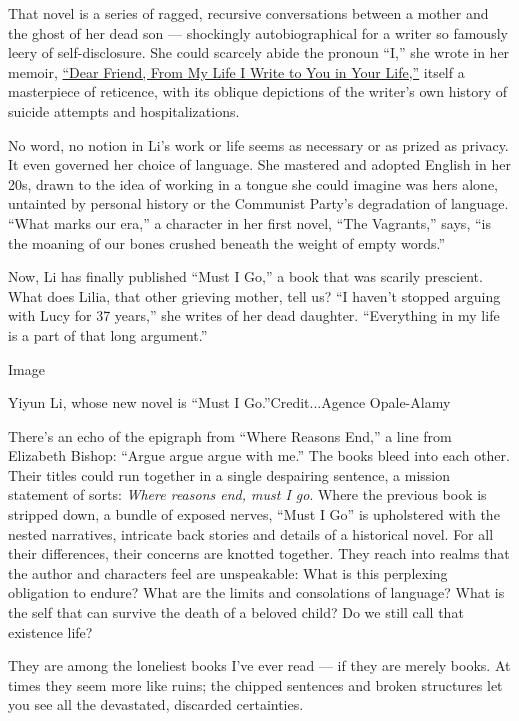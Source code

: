 That novel is a series of ragged, recursive conversations between a
mother and the ghost of her dead son --- shockingly autobiographical for
a writer so famously leery of self-disclosure. She could scarcely abide
the pronoun ``I,'' she wrote in her memoir,
\href{https://www.nytimes3xbfgragh.onion/2017/02/15/books/review/dear-friend-from-my-life-i-write-to-you-in-your-life-yiyun-li.html}{``Dear
Friend, From My Life I Write to You in Your Life,''} itself a
masterpiece of reticence, with its oblique depictions of the writer's
own history of suicide attempts and hospitalizations.

No word, no notion in Li's work or life seems as necessary or as prized
as privacy. It even governed her choice of language. She mastered and
adopted English in her 20s, drawn to the idea of working in a tongue she
could imagine was hers alone, untainted by personal history or the
Communist Party's degradation of language. ``What marks our era,'' a
character in her first novel, ``The Vagrants,'' says, ``is the moaning
of our bones crushed beneath the weight of empty words.''

Now, Li has finally published ``Must I Go,'' a book that was scarily
prescient. What does Lilia, that other grieving mother, tell us? ``I
haven't stopped arguing with Lucy for 37 years,'' she writes of her dead
daughter. ``Everything in my life is a part of that long argument.''

Image

Yiyun Li, whose new novel is ``Must I Go.''Credit...Agence Opale-Alamy

There's an echo of the epigraph from ``Where Reasons End,'' a line from
Elizabeth Bishop: ``Argue argue argue with me.'' The books bleed into
each other. Their titles could run together in a single despairing
sentence, a mission statement of sorts: \emph{Where reasons end, must I
go}. Where the previous book is stripped down, a bundle of exposed
nerves, ``Must I Go'' is upholstered with the nested narratives,
intricate back stories and details of a historical novel. For all their
differences, their concerns are knotted together. They reach into realms
that the author and characters feel are unspeakable: What is this
perplexing obligation to endure? What are the limits and consolations of
language? What is the self that can survive the death of a beloved
child? Do we still call that existence life?

They are among the loneliest books I've ever read --- if they are merely
books. At times they seem more like ruins; the chipped sentences and
broken structures let you see all the devastated, discarded certainties.

